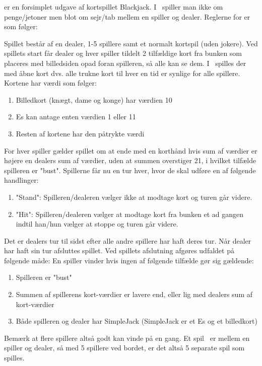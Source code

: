 \sbl er en forsimplet udgave af kortspillet Blackjack. I \sbl\ spiller man ikke om penge/jetoner men blot om sejr/tab mellem en spiller og dealer.  Reglerne for \sbl er som følger:

Spillet består af en dealer, 1-5 spillere samt et normalt kortspil (uden jokere). Ved spillets start får dealer og hver spiller tildelt 2 tilfældige kort fra bunken som placeres med billedsiden opad foran spilleren, så alle kan se dem. I \sbl\ spilles der med åbne kort dvs. alle trukne kort til hver en tid er synlige for alle spillere.  Kortene har værdi som følger:
\begin{enumerate}
\item Billedkort (knægt, dame og konge) har værdien 10
\item Es kan antage enten værdien 1 eller 11
\item Resten af kortene har den påtrykte værdi
\end{enumerate}
For hver spiller gælder spillet om at ende med en korthånd hvis sum af værdier er højere en dealers sum af værdier,  uden at summen overstiger 21, i hvilket tilfælde spilleren er "bust". Spillerne får nu en tur hver, hvor de skal udføre en af følgende handlinger:
\begin{enumerate}
\item "Stand": Spilleren/dealeren vælger ikke at modtage kort og turen går videre.
\item "Hit": Spilleren/dealeren vælger at modtage kort fra bunken et ad gangen indtil han/hun vælger at stoppe og turen går videre.
\end{enumerate}
Det er dealers tur til sidst efter alle andre spillere har haft deres tur. Når dealer har haft sin tur afsluttes spillet. Ved spillets afslutning afgøres udfaldet på følgende måde: En spiller vinder hvis ingen af følgende tilfælde gør sig gældende:
\begin{enumerate}
\item Spilleren er "bust"
\item Summen af spillerens kort-værdier er lavere end, eller lig med dealers sum af kort-værdier
\item Både spilleren og dealer har SimpleJack (SimpleJack er et Es og et billedkort)
\end{enumerate}
Bemærk at flere spillere altså godt kan vinde på en gang. Et spil \sbl\ er mellem en spiller og dealer, 
så med 5 spillere ved bordet, er det altså 5 separate spil som spilles.

